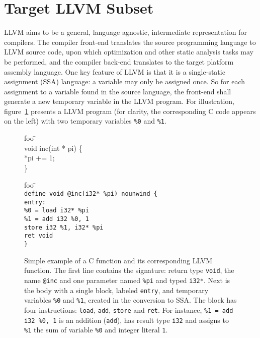 \documentclass{llncs}
\newcommand{\llvm}[1]{\texttt{#1}}
\begin{document}
\section{Target LLVM Subset}
\label{sec:llvm}

LLVM aims to be a general, language agnostic, intermediate representation for
compilers. The compiler front-end translates the source programming language to
LLVM source code, upon which optimization and other static analysis tasks may be
performed, and the compiler back-end translates to the target platform assembly
language. One key feature of LLVM is that it is a single-static assignment (SSA)
language: a variable may only be assigned once. So for each assignment to a
variable found in the source language, the front-end shall generate a new
temporary variable in the LLVM program. For illustration,
figure~\ref{fig:ex-llvm} presents a LLVM program (for clarity, the corresponding
C code appears on the left) with two temporary variables \llvm{\%0} and
\llvm{\%1}.
\begin{figure}
\vspace*{-3em}
  \begin{minipage}[t]{.3\textwidth}
    \begin{tabbing}
      foo \= \kill  \\
      void inc(int * pi) \{\\
      \> *pi += 1; \\
      \}\end{tabbing}
  \end{minipage}
  \hfill
  \begin{minipage}[t]{.6\textwidth}
    \begin{tabbing}
      foo \= \kill  \\
      \llvm{define void @inc(i32* \%pi) nounwind \{} \\
      \llvm{entry:}                      \\
      \> \llvm{\%0 = load i32* \%pi}     \\
      \> \llvm{\%1 = add i32 \%0, 1}     \\
      \> \llvm{store i32 \%1, i32* \%pi} \\
      \> \llvm{ret void} \\
      \llvm{\}}
    \end{tabbing}
  \end{minipage}
  \caption{Simple example of a C function and its corresponding LLVM function.
    The first line contains the signature: return type \llvm{void}, the name
    \llvm{@inc} and one parameter named \llvm{\%pi} and typed \llvm{i32*}.  Next
    is the body with a single block, labeled \llvm{entry}, and temporary
    variables \llvm{\%0} and \llvm{\%1}, created in the conversion to SSA. The
    block has four instructions: \llvm{load}, \llvm{add}, \llvm{store} and
    \llvm{ret}. For instance, \llvm{\%1 = add i32 \%0, 1} is an addition
    (\llvm{add}), has result type \llvm{i32} and assigns to
    \llvm{\%1} the sum of variable \llvm{\%0} and integer
    literal \llvm{1}.}
  \label{fig:ex-llvm}
\end{figure}
\end{document}
